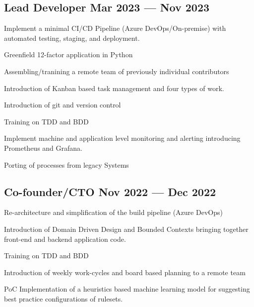 \subsection{{Lead Developer \hfill Mar 2023 --- Nov 2023}}
\begin{zitemize}
	\item Implement a minimal CI/CD Pipeline (Azure DevOps/On-premise) with automated testing, staging, and deployment.
	\item Greenfield 12-factor application in Python
	\item Assembling/tranining a remote team of previously individual contributors
	\item Introduction of Kanban based task management and four types of work.
	\item Introduction of git and version control
	\item Training on TDD and BDD
	\item Implement machine and application level monitoring and alerting introducing Prometheus and Grafana.
	\item Porting of processes from legacy Systems
\end{zitemize}

\subsection{{Co-founder/CTO \hfill Nov 2022 --- Dec 2022}}


\begin{zitemize}
	\item Re-architecture and simplification of the build pipeline (Azure DevOps)
	\item Introduction of Domain Driven Design and Bounded Contexts bringing together front-end and backend application code.
	\item Training on TDD and BDD
	\item Introduction of weekly work-cycles and board based planning to a remote team
	\item PoC Implementation of a heuristics based machine learning model for suggesting best practice configurations of rulesets.
\end{zitemize}

